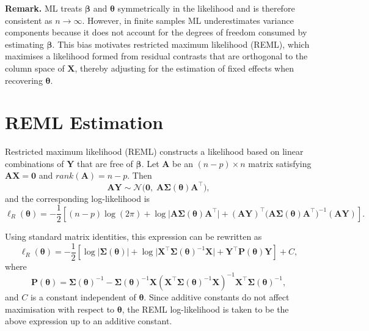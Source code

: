 \documentclass[
  letterpaper,
  DIV=11,
  numbers=noendperiod]{scrartcl}
\begin{document}
\noindent\textbf{Remark.} ML treats \(\symbf{\beta}\) and
\(\symbf{\theta}\) symmetrically in the likelihood and is therefore
consistent as \(n \to \infty\). However, in finite samples ML
underestimates variance components because it does not account for the
degrees of freedom consumed by estimating \(\symbf{\beta}\). This bias
motivates restricted maximum likelihood (REML), which maximises a
likelihood formed from residual contrasts that are orthogonal to the
column space of \(\symbf{X}\), thereby adjusting for the estimation of
fixed effects when recovering \(\symbf{\theta}\).

\section{REML Estimation}\label{reml-estimation}

Restricted maximum likelihood (REML) constructs a likelihood based on
linear combinations of \(\symbf{Y}\) that are free of \(\symbf{\beta}\).
Let \(\symbf{A}\) be an \((n-p)\times n\) matrix satisfying
\(\symbf{A}\symbf{X}=\symbf{0}\) and \(rank(\symbf{A})=n-p\). Then
\begin{equation}
\symbf{AY} \sim \mathcal{N}\big(\symbf{0},\; \symbf{A}\symbf{\Sigma}(\symbf{\theta})\symbf{A}^\top\big),
\end{equation} and the corresponding log-likelihood is \begin{equation}
\ell_R(\symbf{\theta})
=
-\frac{1}{2}\left[
(n-p)\log(2\pi)
+ \log\big|\symbf{A}\symbf{\Sigma}(\symbf{\theta})\symbf{A}^\top\big|
+ (\symbf{AY})^\top \big(\symbf{A}\symbf{\Sigma}(\symbf{\theta})\symbf{A}^\top\big)^{-1} (\symbf{AY})
\right].
\end{equation}

Using standard matrix identities, this expression can be rewritten as
\begin{equation}
\boxed{
\ell_R(\symbf{\theta})
=
-\frac{1}{2}\left[
\log\big|\symbf{\Sigma}(\symbf{\theta})\big|
+ \log\big|\symbf{X}^\top \symbf{\Sigma}(\symbf{\theta})^{-1} \symbf{X}\big|
+ \symbf{Y}^\top \symbf{P}(\symbf{\theta}) \symbf{Y}
\right]
+ C
},
\end{equation} where \begin{equation}
\boxed{
\symbf{P}(\symbf{\theta})
=
\symbf{\Sigma}(\symbf{\theta})^{-1}
-
\symbf{\Sigma}(\symbf{\theta})^{-1}\symbf{X}
\left(
\symbf{X}^\top \symbf{\Sigma}(\symbf{\theta})^{-1}\symbf{X}
\right)^{-1}
\symbf{X}^\top \symbf{\Sigma}(\symbf{\theta})^{-1}
},
\end{equation} and \(C\) is a constant independent of
\(\symbf{\theta}\). Since additive constants do not affect maximisation
with respect to \(\symbf{\theta}\), the REML log-likelihood is taken to
be the above expression up to an additive constant.
\end{document}
